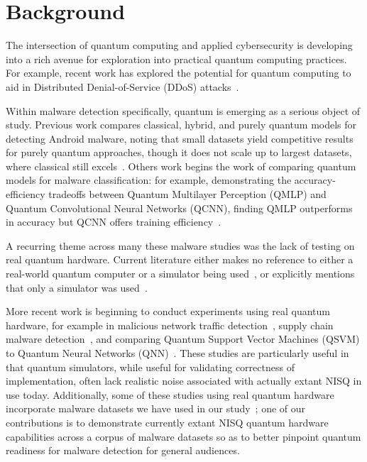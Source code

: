 \documentclass[letterpaper]{article} %
\begin{document}
\section{Background}

The intersection of quantum computing and applied cybersecurity is developing into a rich avenue for exploration into practical quantum computing practices. For example, recent work has explored the potential for quantum computing to aid in Distributed Denial-of-Service (DDoS) attacks~\cite{cogburn2026hardwareawareqaoahoneypottraffic}.

Within malware detection specifically, quantum is emerging as a serious object of study. Previous work compares classical, hybrid, and purely quantum models for detecting Android malware, noting that small datasets yield competitive results for purely quantum approaches, though it does not scale up to largest datasets, where classical still excels~\cite{mercaldo2022towards}. Others work begins the work of comparing quantum models for malware classification: for example, demonstrating the accuracy-efficiency tradeoffs between Quantum Multilayer Perception (QMLP) and Quantum Convolutional Neural Networks (QCNN), finding QMLP outperforms in accuracy but QCNN offers training efficiency~\cite{11249907}.

A recurring theme across many these malware studies was the lack of testing on real quantum hardware. Current literature either makes no reference to either a real-world quantum computer or a simulator being used~\cite{joshi2025quantumaialgorithmdevelopment}, or explicitly mentions that only a simulator was used~\cite{10.1145/3538969.3543816, mercaldo2022towards, 11249907, 10.1145/3696673.3723063}.

More recent work is beginning to conduct experiments using real quantum hardware, for example in malicious network traffic detection~\cite{cotrupi}, supply chain malware detection~\cite{11071553}, and comparing Quantum Support Vector Machines (QSVM) to Quantum Neural Networks (QNN)~\cite{10.1007/978-3-031-74643-7_19}. These studies are particularly useful in that quantum simulators, while useful for validating correctness of implementation, often lack realistic noise associated with actually extant NISQ in use today. Additionally, some of these studies using real quantum hardware incorporate malware datasets we have used in our study~\cite{11071553}; one of our contributions is to demonstrate currently extant NISQ quantum hardware capabilities across a corpus of malware datasets so as to better pinpoint quantum readiness for malware detection for general audiences.
\end{document}
